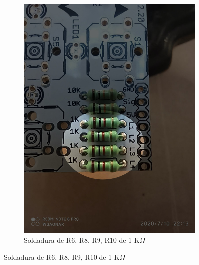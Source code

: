 \documentclass{article}
\begin{document}
\begin{figure}[htbp]
\begin{subfigure}[t]{0.3\textwidth}
        \includegraphics[width=0.9\columnwidth, height=1.2\columnwidth]{images/Botonera/botonera3.jpg}
        \caption{Soldadura de R6, R8, R9, R10 de 1 K$\Omega$}
        \label{fig:botonera_resistencias3}
     \end{subfigure}


\end{figure}
\end{document}
